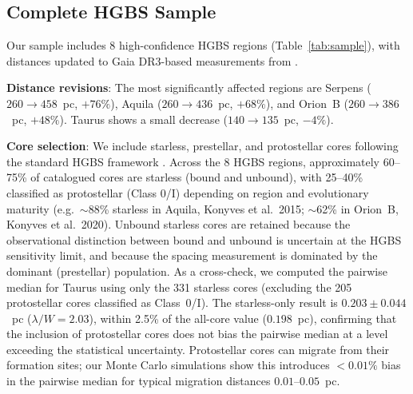 \documentclass[twoside,twocolumn]{mnras}
\begin{document}
\subsection{Complete HGBS Sample}
\label{sec:sample}

Our sample includes 8 high-confidence HGBS regions (Table~\ref{tab:sample}), with
distances updated to Gaia DR3-based measurements from \citet{Zhang2023}.

\textbf{Distance revisions}: The most significantly affected regions are Serpens
($260 \to 458$~pc, $+76\%$), Aquila ($260 \to 436$~pc, $+68\%$), and Orion~B
($260 \to 386$~pc, $+48\%$). Taurus shows a small decrease ($140 \to 135$~pc, $-4\%$).

\textbf{Core selection}: We include starless, prestellar, and protostellar cores
following the standard HGBS framework \citep{Konyves2015, Konyves2020}. Across the
8 HGBS regions, approximately 60--75\% of catalogued cores are starless (bound and
unbound), with 25--40\% classified as protostellar (Class 0/I) depending on region
and evolutionary maturity (e.g.\ $\sim$88\% starless in Aquila, Konyves et al.\ 2015;
$\sim$62\% in Orion~B, Konyves et al.\ 2020). Unbound starless cores are retained
because the observational distinction between bound and unbound is uncertain at the
HGBS sensitivity limit, and because the spacing measurement is dominated by the
dominant (prestellar) population. As a cross-check, we computed the pairwise median for Taurus using only the 331 starless cores (excluding the 205 protostellar cores classified as Class~0/I). The starless-only result is $0.203 \pm 0.044$~pc ($\lambda/W = 2.03$), within 2.5\% of the all-core value ($0.198$~pc), confirming that the inclusion of protostellar cores does not bias the pairwise median at a level exceeding the statistical uncertainty.
Protostellar cores can migrate from their formation
sites; our Monte Carlo simulations show this introduces $<0.01\%$ bias in the pairwise
median for typical migration distances $0.01$--$0.05$~pc.
\end{document}
